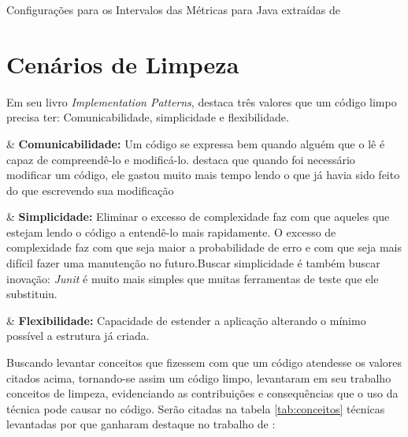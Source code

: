\begin{table}[!ht]
	\begin{center}
		
	\caption{Configurações para os Intervalos das Métricas para Java extraídas de }
	\label{tab:good-metrics}
	\end{center}
	\end{table}
	\FloatBarrier
   


\section{Cenários de Limpeza} 

Em seu livro \textit{Implementation Patterns},  destaca três valores que um código limpo precisa ter: Comunicabilidade, simplicidade e flexibilidade.
	
\begin{easylist}[itemize]

	& \textbf{Comunicabilidade:} Um código se expressa bem quando alguém que o lê é capaz de compreendê-lo e modificá-lo.  destaca que quando foi necessário modificar um código, ele gastou muito mais tempo lendo o que já havia sido feito do que escrevendo sua modificação 
		
	& \textbf{Simplicidade:} Eliminar o excesso de complexidade faz com que aqueles que estejam lendo o código a entendê-lo mais rapidamente. O excesso de complexidade faz com que seja maior a probabilidade de erro e com que seja mais difícil fazer uma manutenção no futuro.Buscar simplicidade é também buscar inovação: \textit{Junit} é muito mais simples que muitas ferramentas de teste que ele substituiu.

	& \textbf{Flexibilidade:} Capacidade de estender a aplicação alterando o mínimo possível a estrutura já criada.
		
\end{easylist}	

Buscando levantar conceitos que fizessem com que um código atendesse os valores citados acima, tornando-se assim um código limpo,  levantaram em seu trabalho conceitos de limpeza, evidenciando as contribuições e consequências que o uso da técnica pode causar no código. Serão citadas na tabela \ref{tab:conceitos} técnicas levantadas por  que ganharam destaque no trabalho de :

